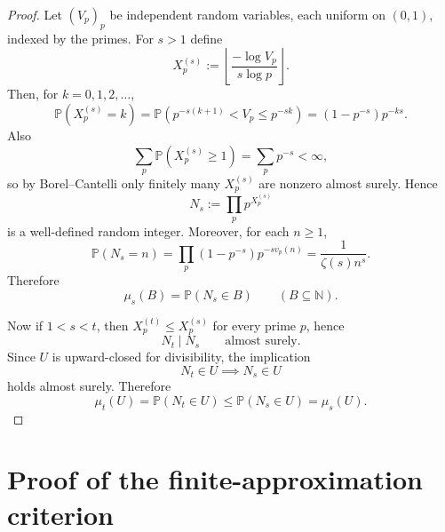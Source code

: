 \documentclass[11pt]{article}
\theoremstyle{definition}
\theoremstyle{remark}
\newcommand{\N}{\mathbb N}
\begin{document}
\begin{proof}
Let \((V_p)_p\) be independent random variables, each uniform on \((0,1)\), indexed by the primes.
For \(s>1\) define
\[
X_p^{(s)}:=\left\lfloor \frac{-\log V_p}{s\log p}\right\rfloor.
\]
Then, for \(k=0,1,2,\dots\),
\[
\mathbb P(X_p^{(s)}=k)
=\mathbb P\!\left(p^{-s(k+1)}<V_p\le p^{-sk}\right)
=(1-p^{-s})p^{-ks}.
\]
Also
\[
\sum_p \mathbb P(X_p^{(s)}\ge 1)=\sum_p p^{-s}<\infty,
\]
so by Borel--Cantelli only finitely many \(X_p^{(s)}\) are nonzero almost surely.
Hence
\[
N_s:=\prod_p p^{X_p^{(s)}}
\]
is a well-defined random integer.
Moreover, for each \(n\ge 1\),
\[
\mathbb P(N_s=n)
=\prod_p (1-p^{-s})p^{-s v_p(n)}
=\frac1{\zeta(s)n^s}.
\]
Therefore
\[
\mu_s(B)=\mathbb P(N_s\in B)
\qquad (B\subseteq\N).
\]

Now if \(1<s<t\), then \(X_p^{(t)}\le X_p^{(s)}\) for every prime \(p\), hence
\[
N_t\mid N_s
\qquad\text{almost surely}.
\]
Since \(U\) is upward-closed for divisibility, the implication
\[
N_t\in U \implies N_s\in U
\]
holds almost surely.
Therefore
\[
\mu_t(U)=\mathbb P(N_t\in U)\le \mathbb P(N_s\in U)=\mu_s(U).
\]
\end{proof}

\section{Proof of the finite-approximation criterion}
\end{document}

